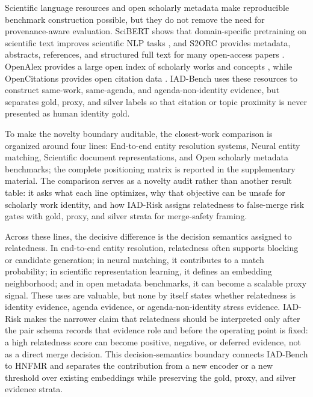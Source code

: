 \documentclass[11pt]{article}
\begin{document}
Scientific language resources and open scholarly metadata make reproducible benchmark construction possible, but they do not remove the need for provenance-aware evaluation. SciBERT shows that domain-specific pretraining on scientific text improves scientific NLP tasks \citep{beltagy2019scibert}, and S2ORC provides metadata, abstracts, references, and structured full text for many open-access papers \citep{lo2019s2orc}. OpenAlex provides a large open index of scholarly works and concepts \citep{priem2022openalex}, while OpenCitations provides open citation data \citep{heibi2019opencitations}. IAD-Bench uses these resources to construct same-work, same-agenda, and agenda-non-identity evidence, but separates gold, proxy, and silver labels so that citation or topic proximity is never presented as human identity gold.

To make the novelty boundary auditable, the closest-work comparison is organized around four lines: End-to-end entity resolution systems, Neural entity matching, Scientific document representations, and Open scholarly metadata benchmarks; the complete positioning matrix is reported in the supplementary material. The comparison serves as a novelty audit rather than another result table: it asks what each line optimizes, why that objective can be unsafe for scholarly work identity, and how IAD-Risk assigns relatedness to false-merge risk gates with gold, proxy, and silver strata for merge-safety framing.

Across these lines, the decisive difference is the decision semantics assigned to relatedness. In end-to-end entity resolution, relatedness often supports blocking or candidate generation; in neural matching, it contributes to a match probability; in scientific representation learning, it defines an embedding neighborhood; and in open metadata benchmarks, it can become a scalable proxy signal. These uses are valuable, but none by itself states whether relatedness is identity evidence, agenda evidence, or agenda-non-identity stress evidence. IAD-Risk makes the narrower claim that relatedness should be interpreted only after the pair schema records that evidence role and before the operating point is fixed: a high relatedness score can become positive, negative, or deferred evidence, not as a direct merge decision. This decision-semantics boundary connects IAD-Bench to HNFMR and separates the contribution from a new encoder or a new threshold over existing embeddings while preserving the gold, proxy, and silver evidence strata.
\end{document}
